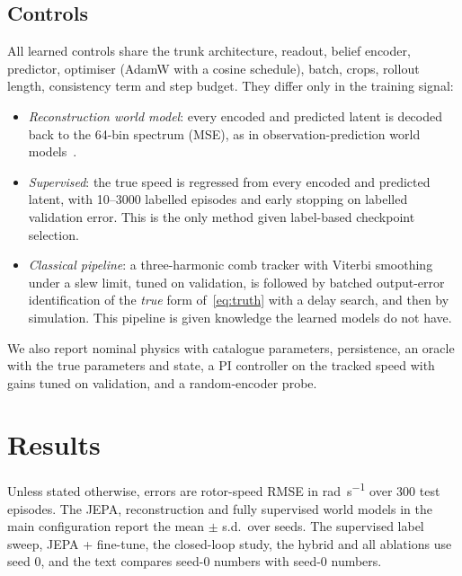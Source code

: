 \documentclass[10pt,journal]{IEEEtran}
\begin{document}
\subsection{Controls}
All learned controls share the trunk architecture, readout, belief encoder, predictor, optimiser (AdamW with a cosine schedule), batch, crops, rollout length, consistency term and step budget. They differ only in the training signal:
\begin{itemize}
\item \emph{Reconstruction world model}: every encoded and predicted latent is decoded back to the 64-bin spectrum (MSE), as in observation-prediction world models~\cite{hafner2019planet}.
\item \emph{Supervised}: the true speed is regressed from every encoded and predicted latent, with 10--3000 labelled episodes and early stopping on labelled validation error. This is the only method given label-based checkpoint selection.
\item \emph{Classical pipeline}: a three-harmonic comb tracker with Viterbi smoothing under a slew limit, tuned on validation, is followed by batched output-error identification of the \emph{true} form of~\eqref{eq:truth} with a delay search, and then by simulation. This pipeline is given knowledge the learned models do not have.
\end{itemize}
We also report nominal physics with catalogue parameters, persistence, an oracle with the true parameters and state, a PI controller on the tracked speed with gains tuned on validation, and a random-encoder probe.

\section{Results}\label{sec:results}
Unless stated otherwise, errors are rotor-speed RMSE in \si{\radian\per\second} over 300 test episodes. The JEPA, reconstruction and fully supervised world models in the main configuration report the mean $\pm$ s.d.\ over \nSeeds{} seeds. The supervised label sweep, JEPA + fine-tune, the closed-loop study, the hybrid and all ablations use seed 0, and the text compares seed-0 numbers with seed-0 numbers.
\end{document}
